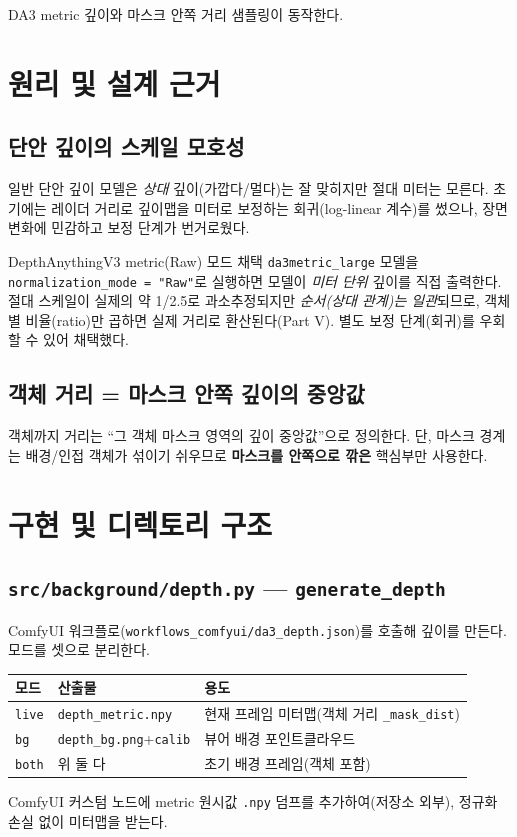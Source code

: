 \begin{statusdone}
DA3 metric 깊이와 마스크 안쪽 거리 샘플링이 동작한다.
\end{statusdone}

\chapter{원리 및 설계 근거}

\section{단안 깊이의 스케일 모호성}
일반 단안 깊이 모델은 \emph{상대} 깊이(가깝다/멀다)는 잘 맞히지만 절대 미터는
모른다. 초기에는 레이더 거리로 깊이맵을 미터로 보정하는 회귀(log-linear 계수)를
썼으나, 장면 변화에 민감하고 보정 단계가 번거로웠다.

\begin{designbox}{DepthAnythingV3 metric(Raw) 모드 채택}
\texttt{da3metric\_large} 모델을 \texttt{normalization\_mode = "Raw"}로 실행하면
모델이 \emph{미터 단위} 깊이를 직접 출력한다. 절대 스케일이 실제의 약 1/2.5로
과소추정되지만 \emph{순서(상대 관계)는 일관}되므로, 객체별 비율(ratio)만 곱하면
실제 거리로 환산된다(Part V). 별도 보정 단계(회귀)를 우회할 수 있어 채택했다.
\end{designbox}

\section{객체 거리 = 마스크 안쪽 깊이의 중앙값}
객체까지 거리는 ``그 객체 마스크 영역의 깊이 중앙값''으로 정의한다. 단,
마스크 경계는 배경/인접 객체가 섞이기 쉬우므로 \textbf{마스크를 안쪽으로 깎은}
핵심부만 사용한다.

\chapter{구현 및 디렉토리 구조}

\section{\texttt{src/background/depth.py} — \texttt{generate\_depth}}
ComfyUI 워크플로(\texttt{workflows\_comfyui/da3\_depth.json})를 호출해 깊이를 만든다.
모드를 셋으로 분리한다.
\begin{center}
\begin{tabular}{@{}llp{6.5cm}@{}}
\toprule
모드 & 산출물 & 용도 \\
\midrule
\texttt{live} & \texttt{depth\_metric.npy} & 현재 프레임 미터맵(객체 거리 \texttt{\_mask\_dist}) \\
\texttt{bg}   & \texttt{depth\_bg.png}+\texttt{calib} & 뷰어 배경 포인트클라우드 \\
\texttt{both} & 위 둘 다 & 초기 배경 프레임(객체 포함) \\
\bottomrule
\end{tabular}
\end{center}
ComfyUI 커스텀 노드에 metric 원시값 \texttt{.npy} 덤프를 추가하여(저장소 외부),
정규화 손실 없이 미터맵을 받는다.

